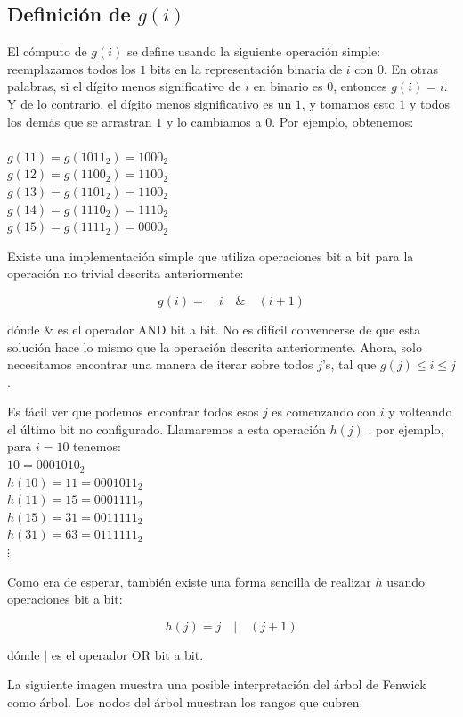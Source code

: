 \subsection{\textbf{Definición de $g(i)$}}

El cómputo de $g(i)$ se define usando la siguiente operación simple: reemplazamos todos los $1$ bits en la representación binaria de $i$ con $0$. En otras palabras, si el dígito menos significativo de $i$ en binario es $0$, entonces $g(i)=i$. Y de lo contrario, el dígito menos significativo es un $1$, y tomamos esto $1$ y todos los demás que se arrastran $1$  y lo cambiamos a $0$. Por ejemplo, obtenemos:\\
\\
$g(11)=  g(1011_2)=  1000_2$\\
$g(12) = g(1100_2) = 1100_2$\\
$g(13) = g(1101_2) = 1100_2$\\
$g(14) = g(1110_2) = 1110_2$\\ 
$g(15) = g(1111_2) = 0000_2$

Existe una implementación simple que utiliza operaciones bit a bit para la operación no trivial descrita anteriormente:

$$g(i) = \quad i \quad \& \quad (i+1)$$

dónde $\&$ es el operador AND bit a bit. No es difícil convencerse de que esta solución hace lo 
mismo que la operación descrita anteriormente. Ahora, solo necesitamos encontrar una manera de 
iterar sobre todos $j$'s, tal que $g(j) \le i \le j$.


Es fácil ver que podemos encontrar todos esos $j$ es comenzando con $i$ y volteando el último bit 
no configurado. Llamaremos a esta operación $h(j)$ . por ejemplo, para $i = 10$ tenemos:\\

$10 = 0001010_2$\\
$h(10) = 11 = 0001011_2$\\
$h(11) = 15 = 0001111_2$\\
$h(15) = 31 = 0011111_2$\\
$h(31) = 63 = 0111111_2$\\
$\vdots$

Como era de esperar, también existe una forma sencilla de realizar $h$ usando operaciones bit a bit:

$$h(j) = j \quad | \quad (j+1) $$

dónde $|$ es el operador OR bit a bit.

La siguiente imagen muestra una posible interpretación del árbol de Fenwick como árbol. Los nodos del árbol muestran los rangos que cubren.

